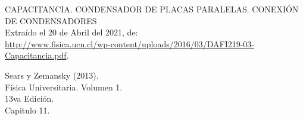 \documentclass[letter,11pt]{article}
\begin{document}
\begin{thebibliography}{99}

 CAPACITANCIA. CONDENSADOR DE PLACAS PARALELAS. CONEXIÓN DE CONDENSADORES \\
Extraído el 20 de Abril del 2021, de: \\
\url{http://www.fisica.ucn.cl/wp-content/uploads/2016/03/DAFI219-03-Capacitancia.pdf}.
 
 Sears y Zemansky (2013).\\
Física Universitaria. Volumen 1.\\
13va Edición.\\
Capitulo 11.

\end{thebibliography}
\end{document}
